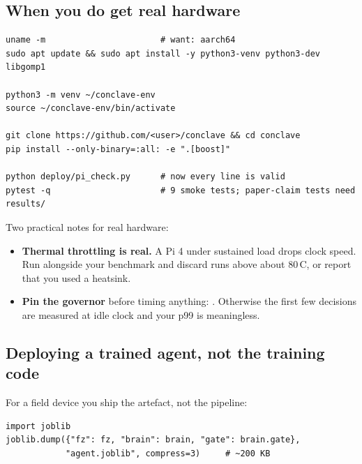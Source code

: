 \subsection{When you do get real hardware}

\begin{codebox}
\begin{lstlisting}[style=shell]
uname -m                       # want: aarch64
sudo apt update && sudo apt install -y python3-venv python3-dev libgomp1

python3 -m venv ~/conclave-env
source ~/conclave-env/bin/activate

git clone https://github.com/<user>/conclave && cd conclave
pip install --only-binary=:all: -e ".[boost]"

python deploy/pi_check.py      # now every line is valid
pytest -q                      # 9 smoke tests; paper-claim tests need results/
\end{lstlisting}
\end{codebox}

\noindent Two practical notes for real hardware:

\begin{itemize}[leftmargin=*,itemsep=3pt]
  \item \textbf{Thermal throttling is real.} A Pi 4 under sustained load drops
        clock speed. Run  alongside your benchmark
        and discard runs above about 80\,\textdegree C, or report that you used
        a heatsink.
  \item \textbf{Pin the governor} before timing anything:
        . Otherwise the first few
        decisions are measured at idle clock and your p99 is meaningless.
\end{itemize}

\subsection{Deploying a trained agent, not the training code}

For a field device you ship the artefact, not the pipeline:

\begin{codebox}
\begin{lstlisting}[style=py]
import joblib
joblib.dump({"fz": fz, "brain": brain, "gate": brain.gate},
            "agent.joblib", compress=3)     # ~200 KB
\end{lstlisting}
\end{codebox}

